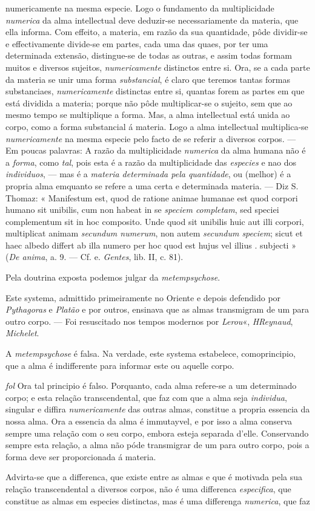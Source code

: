 numericamente na mesma especie. Logo o fundamento da multiplicidade \emph{numerica} da alma intellectual deve deduzir-se necessariamente da materia, que ella informa. Com effeito, a materia, em razão da sua quantidade, pôde dividir-se e effectivamente divide-se em partes, cada uma das quaes, por ter uma determinada extensão, distingue-se de todas as outras, e assim todas formam muitos e diversos sujeitos, \emph{numericamente} distinctos entre si. Ora, se a cada parte da materia se unir uma forma \emph{substancial}, é claro que teremos tantas formas substanciaes, \emph{numericamente} distinctas entre si, quantas forem as partes em que está dividida a materia; porque não pôde multiplicar-se o sujeito, sem que ao mesmo tempo se multiplique a forma. Mas, a alma intellectual está unida ao corpo, como a forma substancial á materia. Logo a alma intellectual multiplica-se \emph{numericamente} na mesma especie pelo facto de se referir a diversos corpos. --- Em poucas palavras: A razão da multiplicidade \emph{numerica} da alma humana não é a \emph{forma}, como \emph{tal}, pois esta é a razão da multiplicidade das \emph{especies} e nao dos \emph{individuos}, --- mas é a \emph{materia determinada pela quantidade}, ou (melhor) é a propria alma emquanto se refere a uma certa e determinada materia. --- Diz S. Thomaz: « Manifestum est, quod de ratione animae humanae est quod corpori humano sit unibilis, cum non habeat in se \emph{speciem completam}, sed speciei complementum sit in hoc composito. Unde quod sit unibilis huic aut illi corpori, multiplicat animam \emph{secundum numerum}, non autem \emph{secundum speciem}; sicut et haec albedo differt ab illa numero per hoc quod est hujus vel illius . subjecti » (\emph{De anima}, a. 9. --- Cf. e. \emph{Gentes}, lib. II, c. 81).\par Pela doutrina exposta podemos julgar da \emph{metempsychose}.\par Este systema, admittido primeiramente no Oriente e depois defendido por \emph{Pythagoras} e \emph{Platão} e por outros, ensinava que as almas transmigram de um para outro corpo. --- Foi resuscitado nos tempos modernos por \emph{Lerou}«, \emph{HReynaud}, \emph{Michelet}.\par A \emph{metempsychose} é falsa. Na verdade, este systema estabelece, comoprincipio, que a alma é indifferente para informar este ou aquelle corpo.\par \emph{fol} Ora tal principio é falso. Porquanto, cada alma refere-se a um determinado corpo; e esta relação transcendental, que faz com que a alma seja \emph{individua}, singular e diffira \emph{numericamente} das outras almas, constitue a propria essencia da nossa alma. Ora a essencia da alma é immutayvel, e por isso a alma conserva sempre uma relação com o seu corpo, embora esteja separada d'elle. Conservando sempre esta relação, a alma não póde transmigrar de um para outro corpo, pois a forma deve ser proporcionada á materia.\par Advirta-se que a differenca, que existe entre as almas e que é motivada pela sua relação transcendental a diversos corpos, não é uma differenca \emph{especifica}, que constitue as almas em especies distinctas, mas é uma differenga \emph{numerica}, que faz 